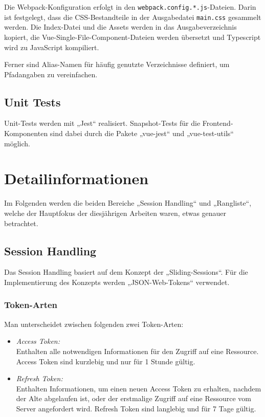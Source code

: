 \documentclass[letterpaper, 10 pt, conference]{ieeeconf}
\begin{document}
Die Webpack-Konfiguration erfolgt in den \texttt{webpack.config.*.js}-Dateien.
Darin ist festgelegt, dass die CSS-Bestandteile in der Ausgabedatei \texttt{main.css} gesammelt werden.
Die Index-Datei und die Assets werden in das Ausgabeverzeichnis kopiert, die Vue-Single-File-Component-Dateien werden übersetzt
und Typescript wird zu JavaScript kompiliert.

Ferner sind Alias-Namen für häufig genutzte Verzeichnisse definiert, um Pfadangaben zu vereinfachen.

\subsection{Unit Tests}

Unit-Tests werden mit „Jest“ realisiert.
Snapshot-Tests für die Frontend-Komponenten sind dabei durch die Pakete „vue-jest“ und „vue-test-utils“ möglich.

\section{Detailinformationen}

Im Folgenden werden die beiden Bereiche „Session Handling“ und „Rangliste“, welche der Hauptfokus der diesjährigen Arbeiten waren, etwas genauer betrachtet.

\subsection{Session Handling}

Das Session Handling basiert auf dem Konzept der „Sliding-Sessions“.  Für die Implementierung des Konzepts werden „JSON-Web-Tokens“\cite{c2} verwendet. 

\subsubsection{Token-Arten}

Man unterscheidet zwischen folgenden zwei Token-Arten:

\begin{itemize}
\item 
\textit{Access Token:}\\
Enthalten alle notwendigen Informationen für den Zugriff auf eine Ressource.  Access Token sind kurzlebig und nur für 1 Stunde gültig.
\item 
\textit{Refresh Token:}\\
Enthalten Informationen, um einen neuen Access Token zu erhalten, nachdem der Alte abgelaufen ist, oder der erstmalige Zugriff auf eine Ressource vom Server angefordert wird.  Refresh Token sind langlebig und für 7 Tage gültig.
\end{itemize}
\end{document}
